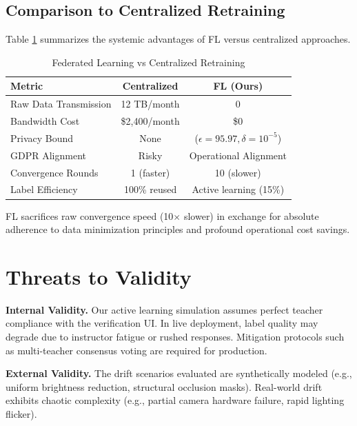 \documentclass[conference]{IEEEtran}
\begin{document}
\subsection{Comparison to Centralized Retraining}

Table \ref{tab:comparison} summarizes the systemic advantages of FL versus centralized approaches.

\begin{table}[h]
\caption{Federated Learning vs Centralized Retraining}
\begin{center}
\begin{tabular}{lcc}
\toprule
\textbf{Metric} & \textbf{Centralized} & \textbf{FL (Ours)} \\
\midrule
Raw Data Transmission & 12 TB/month & 0 \\
Bandwidth Cost & \$2,400/month & \$0 \\
Privacy Bound & None & ($\epsilon=95.97, \delta=10^{-5}$) \\
GDPR Alignment & Risky & Operational Alignment \\
Convergence Rounds & 1 (faster) & 10 (slower) \\
Label Efficiency & 100\% reused & Active learning (15\%) \\
\bottomrule
\end{tabular}
\end{center}
\label{tab:comparison}
\end{table}

FL sacrifices raw convergence speed (10$\times$ slower) in exchange for absolute adherence to data minimization principles and profound operational cost savings.

\section{Threats to Validity}

\textbf{Internal Validity.} Our active learning simulation assumes perfect teacher compliance with the verification UI. In live deployment, label quality may degrade due to instructor fatigue or rushed responses. Mitigation protocols such as multi-teacher consensus voting are required for production.

\textbf{External Validity.} The drift scenarios evaluated are synthetically modeled (e.g., uniform brightness reduction, structural occlusion masks). Real-world drift exhibits chaotic complexity (e.g., partial camera hardware failure, rapid lighting flicker). 
\end{document}
